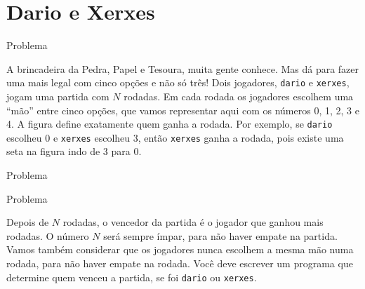 \section{Dario e Xerxes}

\begin{frame}[fragile]{Problema}

A brincadeira da Pedra, Papel e Tesoura, muita gente conhece. Mas dá para fazer uma mais legal com
cinco opções e não só três! Dois jogadores, \texttt{dario} e \texttt{xerxes}, jogam uma partida
com $N$ rodadas. Em cada rodada os jogadores escolhem uma ``mão'' entre cinco opções, que vamos
representar aqui com os números 0, 1, 2, 3 e 4. A figura define exatamente quem ganha a rodada. Por
exemplo, se \texttt{dario} escolheu 0 e \texttt{xerxes} escolheu 3, então \texttt{xerxes} ganha a
rodada, pois existe uma seta na figura indo de 3 para 0.

\end{frame}

\begin{frame}[fragile]{Problema}

    \begin{figure}[!ht]
    \end{figure}

\end{frame}

\begin{frame}[fragile]{Problema}

Depois de $N$ rodadas, o vencedor da partida é o jogador que ganhou mais rodadas. O número $N$
será sempre ímpar, para não haver empate na partida. Vamos também considerar que os jogadores nunca
escolhem a mesma mão numa rodada, para não haver empate na rodada. Você deve escrever um programa
que determine quem venceu a partida, se foi \texttt{dario} ou \texttt{xerxes}.

\end{frame}

